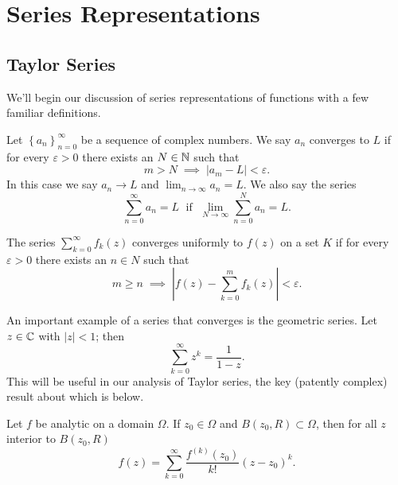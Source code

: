 \documentclass[../m136main.tex]{subfiles}
\begin{document}
\chapter{Series Representations}
\section{Taylor Series}
We'll begin our discussion of series representations of functions with a few familiar definitions.

\begin{definition}
    Let $\left\{ a_n \right\}_{n=0}^\infty$ be a sequence of complex numbers.
    We say $a_n$ converges to $L$ if for every $\varepsilon > 0$ there exists an $N \in \mathbb{N}$ such that
    \[ m > N \;\implies\; |a_m - L| < \varepsilon. \]
    In this case we say $a_n \to L$ and $\lim_{n \to \infty} a_n = L$.
    We also say the series
    \[ \sum_{n=0}^{\infty} a_n = L \;\text{ if }\; \lim_{N \to \infty} \sum_{n=0}^{N} a_n = L. \]
\end{definition}

\begin{definition}
    The series $\sum_{k=0}^{\infty} f_k(z)$ converges uniformly to $f(z)$ on a set $K$ if for every $\varepsilon > 0$ there exists an $n \in N$ such that
    \[ m \geq n \;\implies\; \left| f(z) - \sum_{k=0}^{m} f_k(z) \right| < \varepsilon. \]
\end{definition}

An important example of a series that converges is the geometric series.
Let $z \in \mathbb{C}$ with $|z| < 1$; then
\[ \sum_{k=0}^{\infty} z^{k} = \frac{1}{1-z}. \]
This will be useful in our analysis of Taylor series, the key (patently complex) result about which is below.

\begin{theorem}
    Let $f$ be analytic on a domain $\Omega$.
    If $z_0 \in \Omega$ and $B(z_0, R) \subset \Omega$, then for all $z$ interior to $B(z_0, R)$
    \[ f(z) = \sum_{k=0}^{\infty} \frac{f^{(k)}(z_0)}{k!} (z - z_0)^{k}. \]
\end{theorem}
\end{document}
